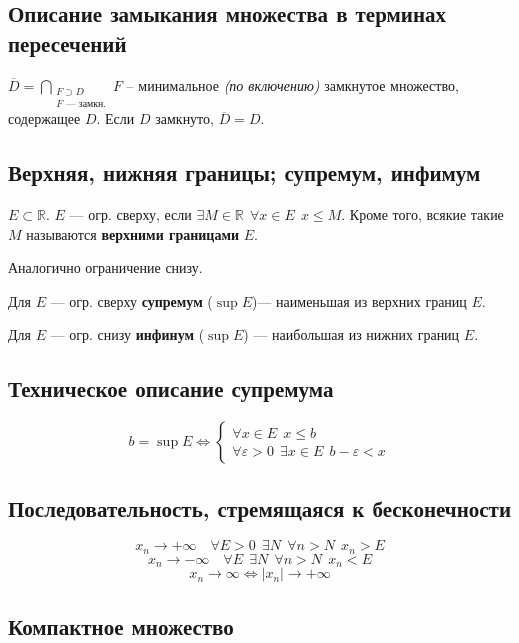 \subsection{Описание замыкания множества в терминах пересечений}

$\overline D = \bigcap\limits_{\substack{F\supset D \\ F \text{ --- замкн.}}} F$ -- минимальное \textit{(по включению)} замкнутое множество, содержащее $D$. Если $D$ замкнуто, $\overline D=D$.

\subsection{Верхняя, нижняя границы; супремум, инфимум}

$E\subset \mathbb{R}$. $E$ --- огр. сверху, если $\exists M\in\mathbb{R} \ \ \forall x\in E \ \ x\leq M$. Кроме того, всякие такие $M$ называются {\bf верхними границами} $E$.

Аналогично ограничение снизу.

Для $E$ --- огр. сверху {\bf супремум} ($\sup E$)--- наименьшая из верхних границ $E$.

Для $E$ --- огр. снизу {\bf инфинум} ($\sup E$) --- наибольшая из нижних границ $E$.

\subsection{Техническое описание супремума}

$$b=\sup E \Leftrightarrow \begin{cases}
    \forall x\in E \ \ x\leq b \\
    \forall \varepsilon > 0 \ \ \exists x\in E \ \ b-\varepsilon<x
\end{cases}$$

\subsection{Последовательность, стремящаяся к бесконечности}

$$x_n\to +\infty \quad \forall E>0 \ \ \exists N \ \ \forall n>N \ \ x_n>E$$
$$x_n\to -\infty \quad \forall E \ \ \exists N \ \ \forall n>N \ \ x_n<E$$
$$x_n\to \infty \Leftrightarrow |x_n|\to +\infty$$

\subsection{Компактное множество}

